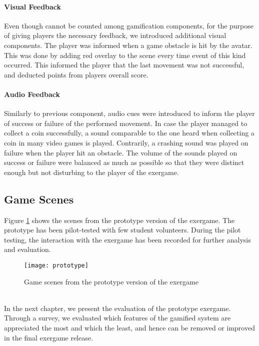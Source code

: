 \paragraph{Visual Feedback}
Even though cannot be counted among gamification components, for the purpose of giving players the necessary feedback, we introduced additional visual components. The player was informed when a game obstacle is hit by the avatar. This was done by adding red overlay to the scene every time event of this kind occurred. This informed the player that the last movement was not successful, and deducted points from players overall score.
\paragraph{Audio Feedback}
Similarly to previous component, audio cues were introduced to inform the player of success or failure of the performed movement. In case the player managed to collect a coin successfully, a sound comparable to the one heard when collecting a coin in many video games is played. Contrarily, a crashing sound was played on failure when the player hit an obstacle. The volume of the sounds played on success or failure were balanced as much as possible so that they were distinct enough but not disturbing to the player of the exergame.
\subsection{Game Scenes}
Figure \ref{fig:prototype} shows the scenes from the prototype version of the exergame. The prototype has been pilot-tested with few student volunteers. During the pilot testing, the interaction with the exergame has been recorded for further analysis and evaluation. 
\begin{figure}[h]
    \centering
    \texttt{[image: prototype]}
    \caption{Game scenes from the prototype version of the exergame}
    \label{fig:prototype}
\end{figure}\\
In the next chapter, we present the evaluation of the prototype exergame. Through a survey, we evaluated which features of the gamified system are appreciated the most and which the least, and hence can be removed or improved in the final exergame release.